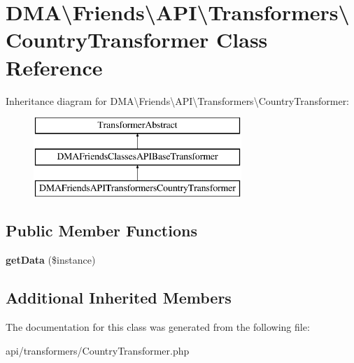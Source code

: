 \hypertarget{classDMA_1_1Friends_1_1API_1_1Transformers_1_1CountryTransformer}{}\section{D\+M\+A\textbackslash{}Friends\textbackslash{}A\+P\+I\textbackslash{}Transformers\textbackslash{}Country\+Transformer Class Reference}
\label{classDMA_1_1Friends_1_1API_1_1Transformers_1_1CountryTransformer}
Inheritance diagram for D\+M\+A\textbackslash{}Friends\textbackslash{}A\+P\+I\textbackslash{}Transformers\textbackslash{}Country\+Transformer\+:\begin{figure}[H]
\begin{center}
\leavevmode
\includegraphics[height=3.000000cm]{d8/d7f/classDMA_1_1Friends_1_1API_1_1Transformers_1_1CountryTransformer}
\end{center}
\end{figure}
\subsection*{Public Member Functions}
\begin{DoxyCompactItemize}
\item 
\hypertarget{classDMA_1_1Friends_1_1API_1_1Transformers_1_1CountryTransformer_aea4d5bbd11286a998dbb6ea7b6879a58}{}{\bfseries get\+Data} (\$instance)\label{classDMA_1_1Friends_1_1API_1_1Transformers_1_1CountryTransformer_aea4d5bbd11286a998dbb6ea7b6879a58}

\end{DoxyCompactItemize}
\subsection*{Additional Inherited Members}


The documentation for this class was generated from the following file\+:\begin{DoxyCompactItemize}
\item 
api/transformers/Country\+Transformer.\+php\end{DoxyCompactItemize}
